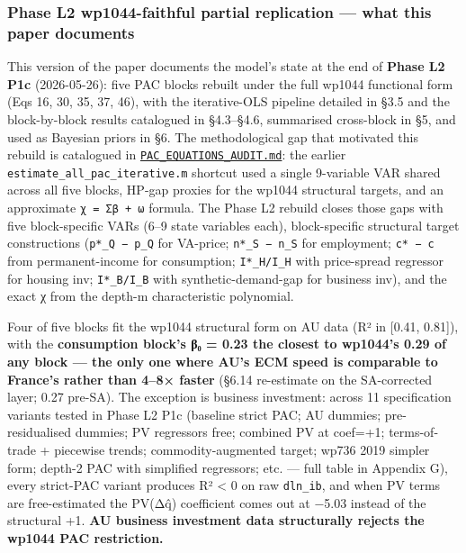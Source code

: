 \documentclass[
]{article}
\begin{document}
\subsubsection{Phase L2 wp1044-faithful partial replication --- what
this paper
documents}\label{phase-l2-wp1044-faithful-partial-replication-what-this-paper-documents}

This version of the paper documents the model's state at the end of
\textbf{Phase L2 P1c} (2026-05-26): five PAC blocks rebuilt under the
full wp1044 functional form (Eqs 16, 30, 35, 37, 46), with the
iterative-OLS pipeline detailed in §3.5 and the block-by-block results
catalogued in §4.3--§4.6, summarised cross-block in §5, and used as
Bayesian priors in §6. The methodological gap that motivated this
rebuild is catalogued in
\href{../PAC_EQUATIONS_AUDIT.md}{\texttt{PAC\_EQUATIONS\_AUDIT.md}}: the
earlier \texttt{estimate\_all\_pac\_iterative.m} shortcut used a single
9-variable VAR shared across all five blocks, HP-gap proxies for the
wp1044 structural targets, and an approximate \texttt{χ\ =\ Σβ\ +\ ω}
formula. The Phase L2 rebuild closes those gaps with five block-specific
VARs (6--9 state variables each), block-specific structural target
constructions (\texttt{p*\_Q\ −\ p\_Q} for VA-price;
\texttt{n*\_S\ −\ n\_S} for employment; \texttt{c*\ −\ c} from
permanent-income for consumption; \texttt{I*\_H/I\_H} with price-spread
regressor for housing inv; \texttt{I*\_B/I\_B} with synthetic-demand-gap
for business inv), and the exact χ from the depth-m characteristic
polynomial.

Four of five blocks fit the wp1044 structural form on AU data (R² in
{[}0.41, 0.81{]}), with the \textbf{consumption block's β₀ = 0.23 the
closest to wp1044's 0.29 of any block --- the only one where AU's ECM
speed is comparable to France's rather than 4--8× faster} (§6.14
re-estimate on the SA-corrected layer; 0.27 pre-SA). The exception is
business investment: across 11 specification variants tested in Phase L2
P1c (baseline strict PAC; AU dummies; pre-residualised dummies; PV
regressors free; combined PV at coef=+1; terms-of-trade + piecewise
trends; commodity-augmented target; wp736 2019 simpler form; depth-2 PAC
with simplified regressors; etc. --- full table in Appendix G), every
strict-PAC variant produces R² \textless{} 0 on raw \texttt{dln\_ib},
and when PV terms are free-estimated the PV(Δq̂) coefficient comes out at
−5.03 instead of the structural +1. \textbf{AU business investment data
structurally rejects the wp1044 PAC restriction.}
\end{document}

